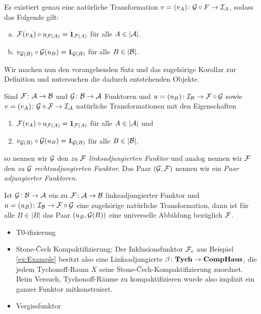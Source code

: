 \begin{kor}
  Es existiert genau eine natürliche Transformation $v = (v_A) \colon \mathcal{G} \circ F \to \mathcal{I}_A$, sodass das Folgende gilt:
  \begin{enumerate}[(a)]
    \item $\mathcal{F}(v_A) \circ u_{\mathcal{F}(A)} = \mathbf{1}_{\mathcal{F}(A)}$ für alle $A \in |\mathcal{A}|$.
    \item $v_{\mathcal{G}(B)} \circ \mathcal{G}(u_B) = \mathbf{1}_{\mathcal{G}(B)}$ für alle $B \in |\mathcal{B}|$.
  \end{enumerate}
\end{kor}

Wir machen nun den vorangehenden Satz und das zugehörige Korollar zur Definition und untersuchen die dadurch entstehenden Objekte.

\begin{defn}
  Sind $\mathcal{F} \colon \mathcal{A} \to \mathcal{B}$ und $\mathcal{G} \colon \mathcal{B} \to \mathcal{A}$ Funktoren und $u = (u_B) \colon \mathcal{I}_{\mathcal{B}} \to \mathcal{F} \circ \mathcal{G}$ sowie $v = (v_A) \colon \mathcal{G} \circ \mathcal{F} \to \mathcal{I}_{\mathcal{A}}$ natürliche Transformationen mit den Eigenschaften
  \begin{enumerate}[(1)]
    \item $\mathcal{F}(v_A) \circ u_{\mathcal{F}(A)} = \mathbf{1}_{\mathcal{F}(A)}$ für alle $A \in |\mathcal{A}|$ und
    \item $v_{\mathcal{G}(B)} \circ \mathcal{G}(u_B) = \mathbf{1}_{\mathcal{G}(B)}$ für alle $B \in |\mathcal{B}|$,
  \end{enumerate}
  so nennen wir $\mathcal{G}$ den \emph{zu $\mathcal{F}$ linksadjungierten Funktor} und analog nennen wir $\mathcal{F}$ den \emph{zu $\mathcal{G}$ rechtsadjungierten Funktor}.
  Das Paar $(\mathcal{G}, \mathcal{F})$ nennen wir ein \emph{Paar adjungierter Funktoren}.
\end{defn}

\begin{thm}
  Ist $\mathcal{G} \colon \mathcal{B} \to \mathcal{A}$ ein zu $\mathcal{F} \colon \mathcal{A} \to \mathcal{B}$ linksadjungierter Funktor und $u = (u_B) \colon \mathcal{I}_{\mathcal{B}} \to \mathcal{F} \circ \mathcal{G}$ eine zugehörige natürliche Transformation, dann ist für alle $B \in |B|$ das Paar $(u_B, \mathcal{G}(B))$ eine universelle Abbildung bezüglich $\mathcal{F}$.
\end{thm}

\begin{bem}
    
\end{bem}

\begin{ex}
  \begin{itemize}
    \item T0-ifizierung
    \item Stone-\v{C}ech Kompaktifizierung: Der Inklusionsfunktor $\mathcal{F}_e$ aus Beispiel \ref{ex:Example} besitzt also eine Linksadjungierte $\beta \colon \mathbf{Tych} \to \mathbf{CompHaus}$, die jedem Tychonoff-Raum $X$ seine Stone-\v{C}ech-Kompaktifizierung zuordnet. Beim Versuch, Tychonoff-Räume zu kompaktifizieren wurde also implizit ein ganzer Funktor mitkonstruiert.
    \item Vergissfunktor
  \end{itemize}
\end{ex}



